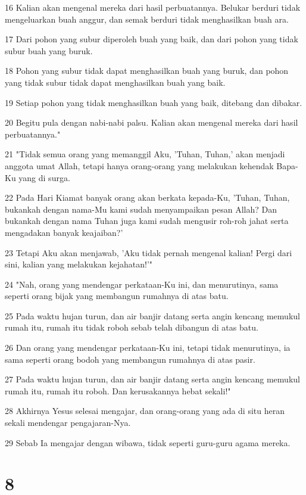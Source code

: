 \par 16 Kalian akan mengenal mereka dari hasil perbuatannya. Belukar berduri tidak mengeluarkan buah anggur, dan semak berduri tidak menghasilkan buah ara.
\par 17 Dari pohon yang subur diperoleh buah yang baik, dan dari pohon yang tidak subur buah yang buruk.
\par 18 Pohon yang subur tidak dapat menghasilkan buah yang buruk, dan pohon yang tidak subur tidak dapat menghasilkan buah yang baik.
\par 19 Setiap pohon yang tidak menghasilkan buah yang baik, ditebang dan dibakar.
\par 20 Begitu pula dengan nabi-nabi palsu. Kalian akan mengenal mereka dari hasil perbuatannya."
\par 21 "Tidak semua orang yang memanggil Aku, 'Tuhan, Tuhan,' akan menjadi anggota umat Allah, tetapi hanya orang-orang yang melakukan kehendak Bapa-Ku yang di surga.
\par 22 Pada Hari Kiamat banyak orang akan berkata kepada-Ku, 'Tuhan, Tuhan, bukankah dengan nama-Mu kami sudah menyampaikan pesan Allah? Dan bukankah dengan nama Tuhan juga kami sudah mengusir roh-roh jahat serta mengadakan banyak keajaiban?'
\par 23 Tetapi Aku akan menjawab, 'Aku tidak pernah mengenal kalian! Pergi dari sini, kalian yang melakukan kejahatan!'"
\par 24 "Nah, orang yang mendengar perkataan-Ku ini, dan menurutinya, sama seperti orang bijak yang membangun rumahnya di atas batu.
\par 25 Pada waktu hujan turun, dan air banjir datang serta angin kencang memukul rumah itu, rumah itu tidak roboh sebab telah dibangun di atas batu.
\par 26 Dan orang yang mendengar perkataan-Ku ini, tetapi tidak menurutinya, ia sama seperti orang bodoh yang membangun rumahnya di atas pasir.
\par 27 Pada waktu hujan turun, dan air banjir datang serta angin kencang memukul rumah itu, rumah itu roboh. Dan kerusakannya hebat sekali!"
\par 28 Akhirnya Yesus selesai mengajar, dan orang-orang yang ada di situ heran sekali mendengar pengajaran-Nya.
\par 29 Sebab Ia mengajar dengan wibawa, tidak seperti guru-guru agama mereka.

\chapter{8}

